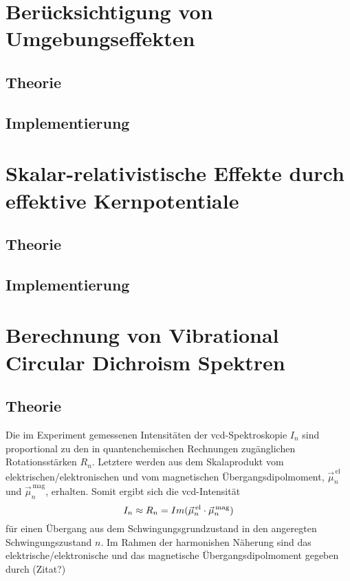 \section{Berücksichtigung von Umgebungseffekten}
	\subsection{Theorie}
	\subsection{Implementierung}
	
\section{Skalar-relativistische Effekte durch effektive Kernpotentiale}
	\subsection{Theorie}
	\subsection{Implementierung}
	
\section{Berechnung von Vibrational Circular Dichroism Spektren}
	\subsection{Theorie}
	Die im Experiment gemessenen Intensitäten der \ac{vcd}-Spektroskopie $I_n$ sind proportional zu den in quantenchemischen Rechnungen zugänglichen Rotationsstärken $R_n$. Letztere werden aus dem Skalaprodukt vom \textcolor{myred}{elektrischen/\-elektronischen} und vom magnetischen Übergangsdipolmoment, $\vec{\mu}_n^{\,\text{el}}$ und $\vec{\mu}_n^{\,\text{mag}}$,  erhalten. Somit ergibt sich die \ac{vcd}-Intensität
	\begin{equation}
	  I_n\approx R_n = Im(\vec{\mu}_n^{\,\text{el}}\cdot\vec{\mu}_n^{\text{\,mag}})
	\end{equation}
	für einen Übergang aus dem Schwingungsgrundzustand in den angeregten Schwingungszustand $n$.\supercite{stephens1985theory,stephens1985vibrational} Im Rahmen der harmonishen Näherung sind das \textcolor{myred}{elektrische/\-elektronische} und das magnetische Übergangsdipolmoment gegeben durch \textcolor{myred}{(Zitat?)}
	

